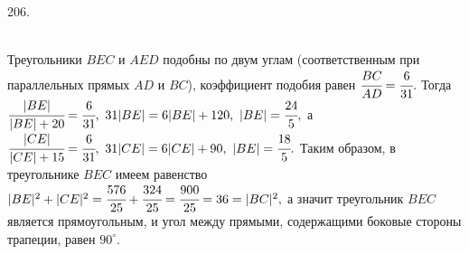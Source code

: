 206. \begin{figure}[ht!]
\end{figure}\\
Треугольники $BEC$ и $AED$ подобны по двум углам (соответственным при параллельных прямых $AD$ и $BC$), коэффициент подобия равен $\cfrac{BC}{AD}=
\cfrac{6}{31}.$ Тогда $\cfrac{|BE|}{|BE|+20}=\cfrac{6}{31},\ 31|BE|=6|BE|+120,\ |BE|=\cfrac{24}{5},$ а $\cfrac{|CE|}{|CE|+15}=\cfrac{6}{31},\ 31|CE|=6|CE|+90,\ |BE|=\cfrac{18}{5}.$ Таким образом, в треугольнике $BEC$ имеем равенство $|BE|^2+|CE|^2=\cfrac{576}{25}+\cfrac{324}{25}=\cfrac{900}{25}=36=|BC|^2,$ а значит треугольник $BEC$ является прямоугольным, и угол между прямыми, содержащими боковые стороны трапеции, равен $90^\circ.$\\
